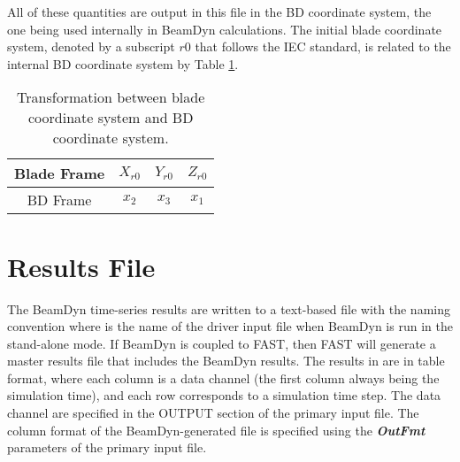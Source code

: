 All of these quantities are output in this file in the BD coordinate system, the one being used internally in BeamDyn calculations. 
The initial blade coordinate system, denoted by a subscript $r0$ that follows the IEC standard, is related to the internal BD coordinate system by Table \ref{tab:IECBD}. 
\begin{table}
\centering
\caption{Transformation between blade coordinate system and BD coordinate system.}
 \label{tab:IECBD}
 \begin{tabular}{| c | c | c | c |}
     \hline
    Blade Frame & $X_{r0}$ & $Y_{r0}$ & $Z_{r0}$ \\ \hline
    BD Frame     & $x_2$ & $x_3$ & $x_1$ \\
    \hline
\end{tabular}
\end{table}

\section{Results File}

The BeamDyn time-series results are written to a text-based file with the naming convention 
 where  is the name of the driver input file when BeamDyn is run in the stand-alone mode. 
If BeamDyn is coupled to FAST, then FAST will generate a master results file that includes the BeamDyn results. 
The results in  are in table format, where each column is a data channel (the first column always being the simulation time), and each row corresponds to a simulation time step. 
The data channel are specified in the OUTPUT section of the primary input file. 
The column format of the BeamDyn-generated file is specified using the  \textbf{\textit{OutFmt}} parameters of the primary input file. 

